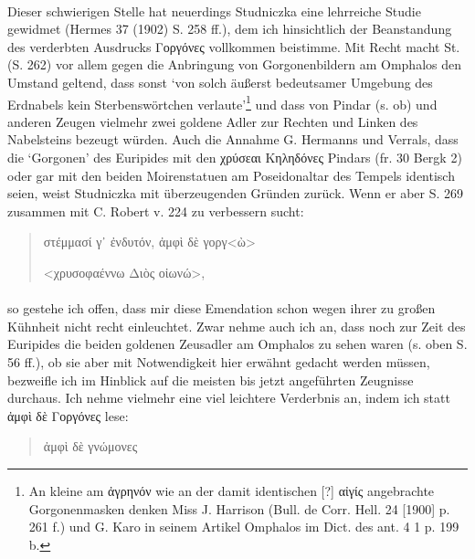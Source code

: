 \documentclass[a4paper, 11pt, oneside]{article}
\begin{document}
\paragraph{}
Dieser schwierigen Stelle hat neuerdings Studniczka eine lehrreiche Studie gewidmet (Hermes 37 (1902) S. 258 ff.), dem ich hinsichtlich der Beanstandung des verderbten Ausdrucks Γοργόνες vollkommen beistimme. Mit Recht macht St. (S. 262) vor allem gegen die Anbringung von Gorgonenbildern am Omphalos den Umstand geltend, dass sonst `von solch äußerst bedeutsamer Umgebung des Erdnabels kein Sterbenswörtchen verlaute'\footnote{An kleine am ἀγρηνόν wie an der damit identischen [?] αἰγίς angebrachte Gorgonenmasken denken Miss J. Harrison (Bull. de Corr. Hell. 24 [1900] p. 261 f.) und G. Karo in seinem Artikel Omphalos im Dict. des ant. 4 1 p. 199 b.} und dass von Pindar (s. ob) und anderen Zeugen vielmehr zwei goldene Adler zur Rechten und Linken des Nabelsteins bezeugt würden. Auch die Annahme G. Hermanns und Verrals, dass die `Gorgonen' des Euripides mit den χρύσεαι Κηληδόνες Pindars (fr. 30 Bergk 2) oder gar mit den beiden Moirenstatuen am Poseidonaltar des Tempels identisch seien, weist Studniczka mit überzeugenden Gründen zurück. Wenn er aber S. 269 zusammen mit C. Robert v. 224 zu verbessern sucht:
\begin{quotation}
στέμμασί γ᾽ ἐνδυτόν, ἀμφὶ δὲ γοργ<ὼ>

<χρυσοφαέννω Διὸς οἰωνώ>,
\end{quotation}
\paragraph{}
so gestehe ich offen, dass mir diese Emendation schon wegen ihrer zu großen Kühnheit nicht recht einleuchtet. Zwar nehme auch ich an, dass noch zur Zeit des Euripides die beiden goldenen Zeusadler am Omphalos zu sehen waren (s. oben S. 56 ff.), ob sie aber mit Notwendigkeit hier erwähnt gedacht werden müssen, bezweifle ich im Hinblick auf die meisten bis jetzt angeführten Zeugnisse durchaus. Ich nehme vielmehr eine viel leichtere Verderbnis an, indem ich statt ἀμφὶ δὲ Γοργόνες lese:
\begin{quotation}
ἀμφὶ δὲ γνώμονες
\end{quotation}
\end{document}
